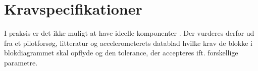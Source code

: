 \section{Kravspecifikationer}
I praksis er det ikke muligt at have ideelle komponenter \cite{Nilsson2011}. Der vurderes derfor ud fra et pilotforsøg, litteratur og accelerometerets datablad hvilke krav de blokke i blokdiagrammet skal opflyde og den tolerance, der accepteres ift. forskellige parametre.


